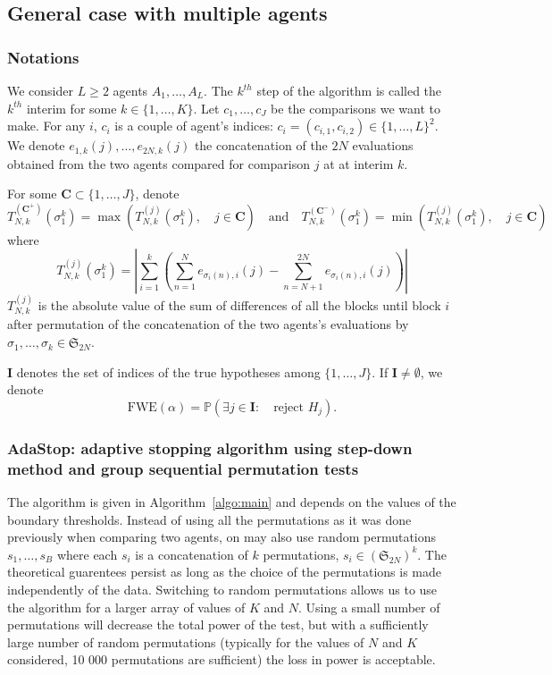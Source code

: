 \documentclass{article}
\theoremstyle{plain}
\theoremstyle{remark}
\renewcommand{\P}{\mathbb{P}}
\renewcommand{\S}{\mathfrak{S}}
\newcommand{\1}{\mathbbm{1}}
\numberwithin{equation}{section}
\begin{document}
\subsection{General case with multiple agents}\label{sec:multi}

\subsubsection{Notations}
 We consider $L\ge 2$ agents $A_1,\dots,A_L$. The $k^{th}$ step of the algorithm is called the $k^{th}$ interim for some $k \in \{1,\dots,K\}$. Let $c_1,\dots,c_J$ be the comparisons we want to make. For any $i$, $c_i$ is a couple of agent's indices: $c_i=(c_{i,1},c_{i,2}) \in \{1,\dots,L\}^2$. We denote $e_{1,k}(j), \dots, e_{2N, k}(j)$ the concatenation of the $2N$ evaluations obtained from the two agents compared for comparison $j$ at at interim $k$.

For some $\textbf{C} \subset \{1,\dots,J\}$, denote
$$T_{N,k}^{(\textbf{C}^+)}(\sigma_1^k)= \max\left(T_{N,k}^{(j)}(\sigma_1^k),\quad j \in \textbf{C}\right) \quad \text{and}\quad T_{N,k}^{(\textbf{C}^-)}(\sigma_1^k)= \min\left(T_{N,k}^{(j)}(\sigma_1^k),\quad j \in \textbf{C}\right)$$
where 
$$T_{N,k}^{(j)}(\sigma_1^k)= \left|\sum_{i=1}^k\left(\sum_{n=1}^{N} e_{\sigma_i(n),i}(j)-\sum_{n=N+1}^{2N} e_{\sigma_i(n),i}(j)\right)\right|$$ 
$T_{N,k}^{(j)}$ is the absolute value of the sum of differences of all the blocks until block $i$ after permutation of the concatenation of the two agents's evaluations by $\sigma_1,\dots,\sigma_k\in \S_{2N}$.
 
$\textbf{I}$ denotes the set of indices of the true hypotheses among $\{1,\dots,J\}$. If $\textbf{I} \neq \emptyset$, we denote 
$$\mathrm{FWE}(\alpha) = \P\left(\exists j \in \textbf{I}:\quad  \text{reject }H_j \right).$$
\subsubsection{AdaStop: adaptive stopping algorithm using step-down method and group sequential permutation tests}\label{sec:main_algo}

The algorithm is given in Algorithm~\ref{algo:main} and depends on the values of the boundary thresholds. 
Instead of using all the permutations as it was done previously when comparing two agents, on may also use random permutations $s_1,\dots,s_B$ where each $s_i$ is a concatenation of $k$ permutations, $s_i\in(\S_{2N})^k$. The theoretical guarentees persist as long as the choice of the permutations is made independently of the data. Switching to random permutations allows us to use the algorithm for a larger array of values of $K$ and $N$. Using a small number of permutations will decrease the total power of the test, but with a sufficiently large number of random permutations (typically for the values of $N$ and $K$ considered, 10 000 permutations are sufficient) the loss in power is acceptable.
\end{document}
